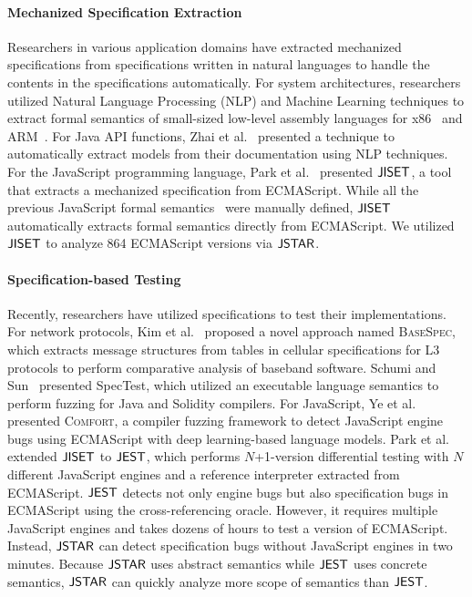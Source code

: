 \paragraph{Mechanized Specification Extraction}
Researchers in various application domains have extracted mechanized specifications from
specifications written in natural languages to handle the contents in the specifications automatically.
For system architectures, researchers utilized Natural
Language Processing (NLP) and Machine Learning techniques to extract formal semantics
of small-sized low-level assembly languages for x86~\cite{x86} and ARM~\cite{arm}.
For Java API functions, Zhai et al.~\cite{javadoc} presented a
technique to automatically extract models from their documentation using NLP techniques.
For the JavaScript programming language, Park et al.~\cite{jiset}
presented $\jiset$, a tool that extracts a mechanized specification from ECMAScript.
While all the previous JavaScript formal semantics~\cite{lambdajs, jscert,
kjs} were manually defined, $\jiset$ automatically extracts formal semantics directly from ECMAScript.
We utilized $\jiset$ to analyze 864 ECMAScript versions via $\tool$.

\paragraph{Specification-based Testing}
Recently, researchers have utilized specifications to test their implementations.
For network protocols, Kim et al.~\cite{basespec} proposed a novel approach named
\textsc{BaseSpec}, which extracts message structures from tables in cellular
specifications for L3 protocols to perform comparative analysis of baseband software.
Schumi and Sun~\cite{spectest} presented SpecTest, which utilized an
executable language semantics to perform fuzzing for Java and Solidity compilers.
For JavaScript, Ye et al.~\cite{comfort} presented \textsc{Comfort}, a
compiler fuzzing framework to detect JavaScript engine bugs using ECMAScript
with deep learning-based language models.
Park et al.~\cite{jest} extended $\jiset$ to $\jest$, which performs $N$+1-version differential testing
with $N$ different JavaScript engines and a reference interpreter extracted from ECMAScript.
$\jest$ detects not only engine bugs but also specification bugs in
ECMAScript using the cross-referencing oracle.  However, it requires multiple JavaScript engines and
takes dozens of hours to test a version of ECMAScript.
Instead, $\tool$ can detect specification bugs without JavaScript engines in two minutes.
Because $\tool$ uses abstract semantics while $\jest$ uses concrete semantics,
$\tool$ can quickly analyze more scope of semantics than $\jest$.

